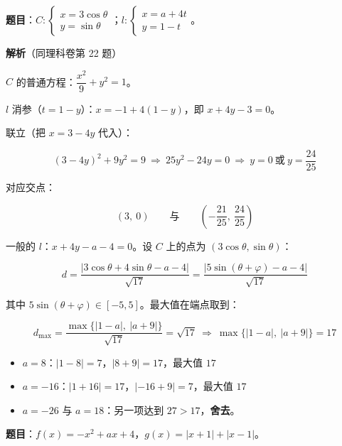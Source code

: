 

\textbf{题目}：$C:\begin{cases}x=3\cos\theta\\ y=\sin\theta\end{cases}$；$l:\begin{cases}x=a+4t\\ y=1-t\end{cases}$。

\textbf{解析}（同理科卷第 22 题）


$C$ 的普通方程：$\dfrac{x^{2}}9+y^{2}=1$。

$l$ 消参（$t=1-y$）：$x=-1+4(1-y)$，即 $x+4y-3=0$。

联立（把 $x=3-4y$ 代入）：

\[(3-4y)^{2}+9y^{2}=9\ \Longrightarrow\ 25y^{2}-24y=0\ \Longrightarrow\ y=0\ \text{或}\ y=\frac{24}{25}\]

对应交点：

\[(3,\ 0)\qquad\text{与}\qquad\left(-\frac{21}{25},\ \frac{24}{25}\right)\]


一般的 $l$：$x+4y-a-4=0$。设 $C$ 上的点为 $(3\cos\theta,\sin\theta)$：

\[d=\frac{|3\cos\theta+4\sin\theta-a-4|}{\sqrt{17}}=\frac{\left|5\sin(\theta+\varphi)-a-4\right|}{\sqrt{17}}\]

其中 $5\sin(\theta+\varphi)\in[-5,5]$。最大值在端点取到：

\[d_{\max}=\frac{\max\{|1-a|,\ |a+9|\}}{\sqrt{17}}=\sqrt{17}\ \Longrightarrow\ \max\{|1-a|,\ |a+9|\}=17\]

\begin{itemize}
\item $a=8$：$|1-8|=7$，$|8+9|=17$，最大值 $17$ 
\item $a=-16$：$|1+16|=17$，$|-16+9|=7$，最大值 $17$ 
\item $a=-26$ 与 $a=18$：另一项达到 $27>17$，\textbf{舍去}。
\end{itemize}


\par\medskip


\textbf{题目}：$f(x)=-x^{2}+ax+4$，$g(x)=|x+1|+|x-1|$。

